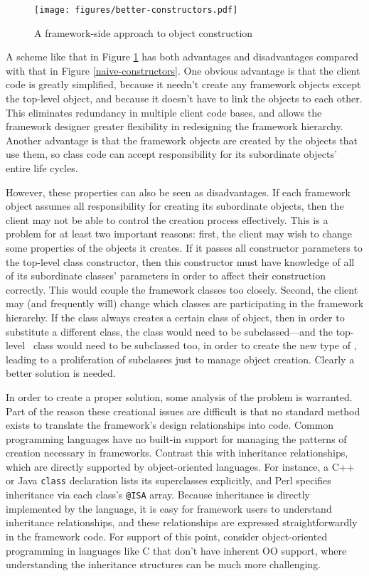 \begin{figure}
\texttt{[image: figures/better-constructors.pdf]}
\caption{A framework-side approach to object construction}
\label{better-constructors}
\end{figure}

A scheme like that in Figure \ref{better-constructors} has both
advantages and disadvantages compared with that in Figure
\ref{naive-constructors}.  One obvious advantage is that the client
code is greatly simplified, because it needn't create any framework
objects except the top-level object, and because it doesn't have to
link the objects to each other.  This eliminates redundancy in
multiple client code bases, and allows the framework designer greater
flexibility in redesigning the framework hierarchy.  Another advantage
is that the framework objects are created by the objects that use
them, so class code can accept responsibility for its subordinate
objects' entire life cycles.

However, these properties can also be seen as disadvantages.  If each
framework object assumes all responsibility for creating its
subordinate objects, then the client may not be able to control the
creation process effectively.  This is a problem for at least two
important reasons: first, the client may wish to change some
properties of the objects it creates.  If it passes all constructor
parameters to the top-level class constructor, then this constructor
must have knowledge of all of its subordinate classes' parameters in
order to affect their construction correctly.  This would couple the
framework classes too closely.  Second, the client may (and frequently
will) change which classes are participating in the framework
hierarchy.  If the  class always creates a certain
class of  object, then in order to substitute a
different  class, the  class
would need to be subclassed---and the top-level \aicat\ class would
need to be subclassed too, in order to create the new type of
, leading to a proliferation of subclasses just to
manage object creation.  Clearly a better solution is needed.

In order to create a proper solution, some analysis of the problem is
warranted.  Part of the reason these creational issues are difficult
is that no standard method exists to translate the framework's design
relationships into code.  Common programming languages have no
built-in support for managing the patterns of creation necessary in
frameworks.  Contrast this with inheritance relationships, which are
directly supported by object-oriented languages.  For instance, a C++
or Java \texttt{class} declaration lists its superclasses explicitly,
and Perl specifies inheritance via each class's \texttt{@ISA} array.
Because inheritance is directly implemented by the language, it is
easy for framework users to understand inheritance relationships, and
these relationships are expressed straightforwardly in the framework
code.  For support of this point, consider object-oriented programming
in languages like C that don't have inherent OO support, where
understanding the inheritance structures can be much more
challenging. \cite[p. 7]{fayad:99}

